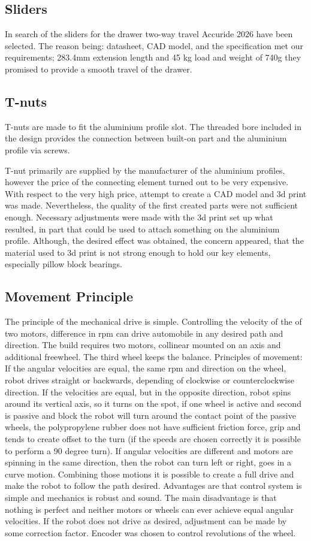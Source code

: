 \documentclass[11pt]{article}
\begin{document}
\subsection*{Sliders}
In search of the sliders for the drawer two-way travel Accuride 2026 have been selected. The reason being: datasheet, CAD model, and the specification met our requirements; 283.4mm extension length and 45 kg load and weight of 740g they promised to provide a smooth travel of the drawer.


\subsection*{T-nuts}
T-nuts are made to fit the aluminium profile slot. The threaded bore included in the design provides the connection between built-on part and the aluminium profile via screws.


T-nut primarily are supplied by the manufacturer of the aluminium profiles, however the price of the connecting element turned out to be very expensive. With respect to the very high price, attempt to create a CAD model and 3d print was made. Nevertheless, the quality of the first created parts were not sufficient enough. Necessary adjustments were made with the 3d print set up what resulted, in part that could be used to attach something on the aluminium profile. Although, the desired effect was obtained, the concern appeared, that the material used to 3d print is not strong enough to hold our key elements, especially pillow block bearings.


\subsection*{Movement Principle}
The principle of the mechanical drive is simple. Controlling the velocity of the of two motors, difference in rpm can drive automobile in any desired path and direction. The build requires two motors, collinear mounted on an axis and additional freewheel. The third wheel keeps the balance. Principles of movement: If the angular velocities are equal, the same rpm and direction on the wheel, robot drives straight or backwards, depending of clockwise or counterclockwise direction. If the velocities are equal, but in the opposite direction, robot spins around its vertical axis, so it turns on the spot, if one wheel is active and second is passive and block the robot will turn around the contact point of the passive wheels, the polypropylene rubber does not have sufficient friction force, grip and tends to create offset to the turn (if the speeds are chosen correctly it is possible to perform a 90 degree turn). If angular velocities are different and motors are spinning in the same direction, then the robot can turn left or right, goes in a curve motion. Combining those motions it is possible to create a full drive and make the robot to follow the path desired. Advantages are that control system is simple and mechanics is robust and sound. The main disadvantage is that nothing is perfect and neither motors or wheels can ever achieve equal angular velocities. If the robot does not drive as desired, adjustment can be made by some correction factor. Encoder was chosen to control revolutions of the wheel.
\end{document}
